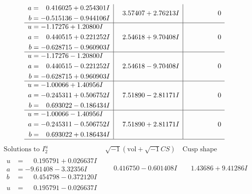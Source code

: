 \documentclass[1p]{elsarticle_modified}
\theoremstyle{definition}
\newcommand{\I}{\sqrt{-1}}
\begin{document}
$$\begin{array}{c|c|c}
\begin{aligned}
a &= \phantom{-}0.416025 + 0.254301 I \\
b &= -0.515136 - 0.944106 I\end{aligned}
 & \phantom{-}3.57407 + 2.76213 I & \phantom{-0.000000 } 0 \\ \hline\begin{aligned}
u &= -1.17276 + 1.20800 I \\
a &= \phantom{-}0.440515 + 0.221252 I \\
b &= -0.628715 - 0.960903 I\end{aligned}
 & \phantom{-}2.54618 + 9.70408 I & \phantom{-0.000000 } 0 \\ \hline\begin{aligned}
u &= -1.17276 - 1.20800 I \\
a &= \phantom{-}0.440515 - 0.221252 I \\
b &= -0.628715 + 0.960903 I\end{aligned}
 & \phantom{-}2.54618 - 9.70408 I & \phantom{-0.000000 } 0 \\ \hline\begin{aligned}
u &= -1.00066 + 1.40956 I \\
a &= -0.245311 + 0.506752 I \\
b &= \phantom{-}0.693022 - 0.186434 I\end{aligned}
 & \phantom{-}7.51890 - 2.81171 I & \phantom{-0.000000 } 0 \\ \hline\begin{aligned}
u &= -1.00066 - 1.40956 I \\
a &= -0.245311 - 0.506752 I \\
b &= \phantom{-}0.693022 + 0.186434 I\end{aligned}
 & \phantom{-}7.51890 + 2.81171 I & \phantom{-0.000000 } 0\\
 \hline 
 \end{array}$$\newpage$$\begin{array}{c|c|c}  
\text{Solutions to }I^u_{2}& \I (\text{vol} + \sqrt{-1}CS) & \text{Cusp shape}\\
 \hline 
\begin{aligned}
u &= \phantom{-}0.195791 + 0.026637 I \\
a &= -9.61408 - 3.32356 I \\
b &= \phantom{-}0.454798 - 0.372120 I\end{aligned}
 & \phantom{-}0.416750 - 0.601408 I & \phantom{-}1.43686 + 9.41286 I \\ \hline\begin{aligned}
u &= \phantom{-}0.195791 - 0.026637 I \\

\end{aligned}
\end{array}$$
\end{document}
